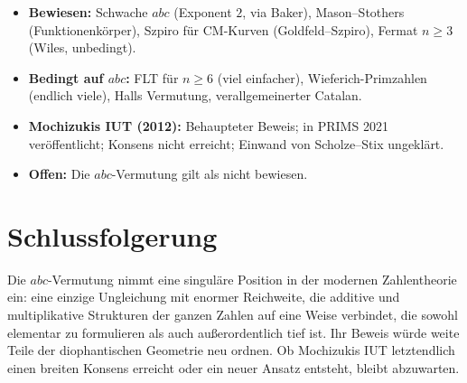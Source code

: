 \documentclass[12pt,a4paper]{article}
\theoremstyle{remark}
\begin{document}
\begin{itemize}[nosep]
  \item \textbf{Bewiesen:} Schwache $abc$ (Exponent $2$, via Baker), Mason--Stothers
    (Funktionenkörper), Szpiro für CM-Kurven (Goldfeld--Szpiro), Fermat $n\geq 3$
    (Wiles, unbedingt).
  \item \textbf{Bedingt auf $abc$:} FLT für $n\geq 6$ (viel einfacher), Wieferich-Primzahlen
    (endlich viele), Halls Vermutung, verallgemeinerter Catalan.
  \item \textbf{Mochizukis IUT (2012):} Behaupteter Beweis; in PRIMS 2021 veröffentlicht;
    Konsens nicht erreicht; Einwand von Scholze--Stix ungeklärt.
  \item \textbf{Offen:} Die $abc$-Vermutung gilt als nicht bewiesen.
\end{itemize}

\section{Schlussfolgerung}

Die $abc$-Vermutung nimmt eine singuläre Position in der modernen Zahlentheorie ein:
eine einzige Ungleichung mit enormer Reichweite, die additive und multiplikative Strukturen
der ganzen Zahlen auf eine Weise verbindet, die sowohl elementar zu formulieren als auch
außerordentlich tief ist. Ihr Beweis würde weite Teile der diophantischen Geometrie neu
ordnen. Ob Mochizukis IUT letztendlich einen breiten Konsens erreicht oder ein neuer Ansatz
entsteht, bleibt abzuwarten.
\end{document}
